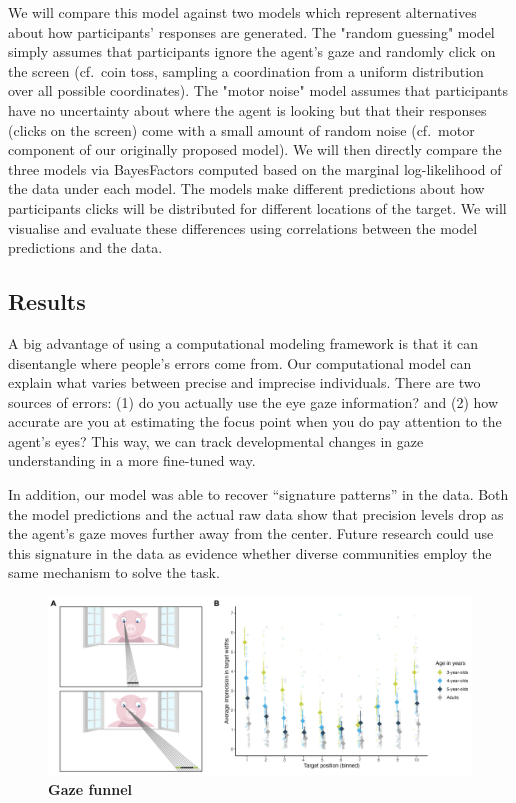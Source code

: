 \documentclass[
  man,floatsintext]{apa6}
\begin{document}
We will compare this model against two models which represent alternatives about how participants' responses are generated.
The "random guessing" model simply assumes that participants ignore the agent's gaze and randomly click on the screen (cf.~coin toss, sampling a coordination from a uniform distribution over all possible coordinates).
The "motor noise" model assumes that participants have no uncertainty about where the agent is looking but that their responses (clicks on the screen) come with a small amount of random noise (cf.~motor component of our originally proposed model).
We will then directly compare the three models via BayesFactors computed based on the marginal log-likelihood of the data under each model.
The models make different predictions about how participants\textquotesingle{} clicks will be distributed for different locations of the target.
We will visualise and evaluate these differences using correlations between the model predictions and the data.

\hypertarget{results-1}{%
\subsection{Results}\label{results-1}}

A big advantage of using a computational modeling framework is that it can disentangle where people's errors come from.
Our computational model can explain what varies between precise and imprecise individuals.
There are two sources of errors: (1) do you actually use the eye gaze information?
and (2) how accurate are you at estimating the focus point when you do pay attention to the agent's eyes?
This way, we can track developmental changes in gaze understanding in a more fine-tuned way.

In addition, our model was able to recover ``signature patterns'' in the data.
Both the model predictions and the actual raw data show that precision levels drop as the agent's gaze moves further away from the center.
Future research could use this signature in the data as evidence whether diverse communities employ the same mechanism to solve the task.



\begin{figure}

{\centering \includegraphics[width=1\linewidth]{../figures/gazefunnel_combined} 

}

\caption{\textbf{Gaze funnel}}\label{fig:fig3}
\end{figure}
\end{document}
